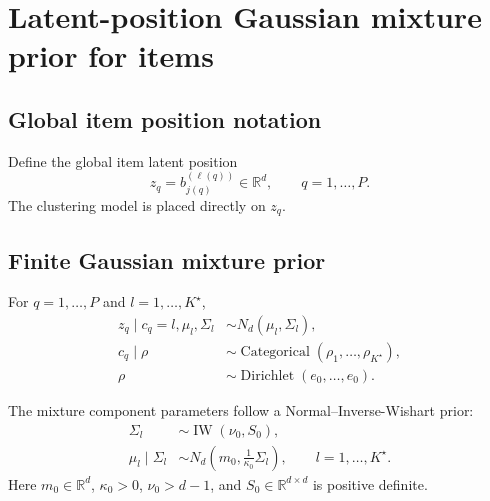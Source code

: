 \documentclass[11pt]{article}
\newcommand{\R}{\mathbb R}
\DeclareMathOperator{\Cat}{Categorical}
\DeclareMathOperator{\Dir}{Dirichlet}
\DeclareMathOperator{\IW}{IW}
\begin{document}
\section{Latent-position Gaussian mixture prior for items}

\subsection{Global item position notation}

Define the global item latent position
\begin{equation}
    z_q
    =
    b_{j(q)}^{(\ell(q))}
    \in\R^d,
    \qquad q=1,\dots,P.
    \label{eq:global-item-position}
\end{equation}
The clustering model is placed directly on $z_q$.

\subsection{Finite Gaussian mixture prior}

For $q=1,\dots,P$ and $l=1,\dots,K^\star$,
\begin{align}
    z_q\mid c_q=l,\mu_l,\Sigma_l
    &\sim N_d(\mu_l,\Sigma_l),
    \label{eq:z-mixture}\\
    c_q\mid \rho
    &\sim \Cat(\rho_1,\dots,\rho_{K^\star}),\\
    \rho
    &\sim \Dir(e_0,\dots,e_0).
    \label{eq:rho-prior}
\end{align}

The mixture component parameters follow a Normal--Inverse-Wishart prior:
\begin{align}
    \Sigma_l
    &\sim \IW(\nu_0,S_0),
    \label{eq:sigma-niw-prior}\\
    \mu_l\mid \Sigma_l
    &\sim N_d\left(m_0,\frac{1}{\kappa_0}\Sigma_l\right),
    \qquad l=1,\dots,K^\star.
    \label{eq:mu-niw-prior}
\end{align}
Here $m_0\in\R^d$, $\kappa_0>0$, $\nu_0>d-1$, and
$S_0\in\R^{d\times d}$ is positive definite.
\end{document}

